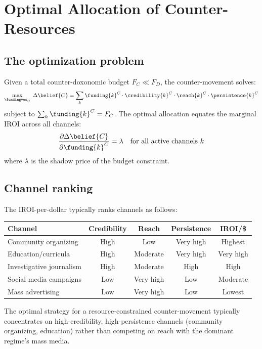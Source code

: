 \section{Optimal Allocation of Counter-Resources}
\label{sec:ch31-optimal}

\subsection{The optimization problem}

\begin{model}
\label{mod:counter-optimal}
Given a total counter-doxonomic budget $F_C \ll F_D$, the counter-movement solves:
\[
  \max_{\fundingvec_C} \; \Delta\belief{C} = \sum_k \funding{k}^C \cdot \credibility{k}^C \cdot \reach{k}^C \cdot \persistence{k}^C
\]
subject to $\sum_k \funding{k}^C = F_C$.
The optimal allocation equates the marginal IROI across all channels:
\[
  \frac{\partial \Delta\belief{C}}{\partial \funding{k}^C} = \lambda \quad \text{for all active channels } k
\]
where $\lambda$ is the shadow price of the budget constraint.
\end{model}

\subsection{Channel ranking}

The IROI-per-dollar typically ranks channels as follows:

\begin{center}
\begin{tabular}{lcccc}
\toprule
Channel & Credibility & Reach & Persistence & IROI/\$ \\
\midrule
Community organizing & High & Low & Very high & Highest \\
Education/curricula & High & Moderate & Very high & Very high \\
Investigative journalism & High & Moderate & High & High \\
Social media campaigns & Low & Very high & Low & Moderate \\
Mass advertising & Low & Very high & Low & Lowest \\
\bottomrule
\end{tabular}
\end{center}

The optimal strategy for a resource-constrained counter-movement typically concentrates on high-credibility, high-persistence channels (community organizing, education) rather than competing on reach with the dominant regime's mass media.

